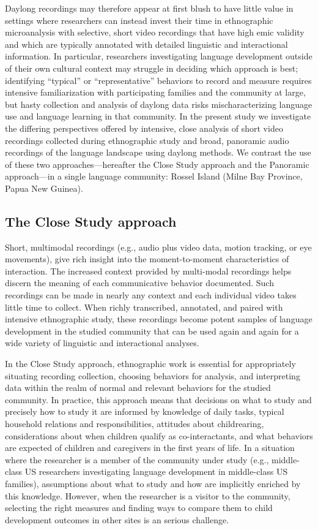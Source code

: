 \documentclass[,man,mask,floatsintext]{apa6}
\begin{document}
Daylong recordings may therefore appear at first blush to have little
value in settings where researchers can instead invest their time in
ethnographic microanalysis with selective, short video recordings that
have high emic validity and which are typically annotated with detailed
linguistic and interactional information. In particular, researchers
investigating language development outside of their own cultural context
may struggle in deciding which approach is best; identifying
\enquote{typical} or \enquote{representative} behaviors to record and
measure requires intensive familiarization with participating families
and the community at large, but hasty collection and analysis of daylong
data risks mischaracterizing language use and language learning in that
community. In the present study we investigate the differing
perspectives offered by intensive, close analysis of short video
recordings collected during ethnographic study and broad, panoramic
audio recordings of the language landscape using daylong methods. We
contrast the use of these two approaches---hereafter the Close Study
approach and the Panoramic approach---in a single language community:
Rossel Island (Milne Bay Province, Papua New Guinea).

\subsection{The Close Study approach}\label{the-close-study-approach}

Short, multimodal recordings (e.g., audio plus video data, motion
tracking, or eye movements), give rich insight into the moment-to-moment
characteristics of interaction. The increased context provided by
multi-modal recordings helps discern the meaning of each communicative
behavior documented. Such recordings can be made in nearly any context
and each individual video takes little time to collect. When richly
transcribed, annotated, and paired with intensive ethnographic study,
these recordings become potent samples of language development in the
studied community that can be used again and again for a wide variety of
linguistic and interactional analyses.

In the Close Study approach, ethnographic work is essential for
appropriately situating recording collection, choosing behaviors for
analysis, and interpreting data within the realm of normal and relevant
behaviors for the studied community. In practice, this approach means
that decisions on what to study and precisely how to study it are
informed by knowledge of daily tasks, typical household relations and
responsibilities, attitudes about childrearing, considerations about
when children qualify as co-interactants, and what behaviors are
expected of children and caregivers in the first years of life. In a
situation where the researcher is a member of the community under study
(e.g., middle-class US researchers investigating language development in
middle-class US families), assumptions about what to study and how are
implicitly enriched by this knowledge. However, when the researcher is a
visitor to the community, selecting the right measures and finding ways
to compare them to child development outcomes in other sites is an
serious challenge.
\end{document}
